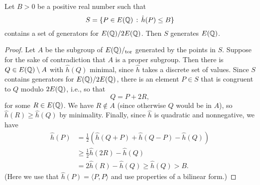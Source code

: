 \begin{lemma}\label{lem:allgen}
Let $B>0$ be a positive real number such that 
$$
   S = \{ P \in E(\mathbb{Q})\, : \, \hat{h}(P) \leq B \}
$$
contains a set of generators for $E(\mathbb{Q})/2 E(\mathbb{Q})$.  Then
$S$ generates $E(\mathbb{Q})$.
\end{lemma}
\begin{proof}
  Let $A$ be the subgroup of $E(\mathbb{Q})/_{\operatorname{tor}}$ generated by the points
  in $S$.  Suppose for the sake of contradiction that $A$ is a proper
  subgroup. Then there is $Q\in E(\mathbb{Q})\setminus A$ with $\hat{h}(Q)$
minimal, since $\hat{h}$ takes a discrete set of values.
Since $S$ contains generators for $E(\mathbb{Q})/2 E(\mathbb{Q})$, there is
an element $P \in S$ that is congruent to $Q$ modulo $2 E(\mathbb{Q})$, 
i.e., so that
   $$
      Q = P + 2R,
$$
for some $R\in E(\mathbb{Q})$.
We have $R\not\in A$ (since otherwise $Q$ would be in $A$), so
$\hat{h}(R)\geq \hat{h}(Q)$ by minimality.  
Finally, since $\hat{h}$ is quadratic and nonnegative, we have
\begin{align*}
 \hat{h}(P) &= \frac{1}{2}\left(\hat{h}(Q+P) + \hat{h}(Q-P) - \hat{h}(Q)\right)\\
   &\geq \frac{1}{2} \hat{h}(2R) - \hat{h}(Q)\\
  &=2\hat{h}(R) - \hat{h}(Q) \geq \hat{h}(Q) > B.
\end{align*}
(Here we use that $\hat{h}(P) =\langle P, P\rangle$
and use properties of a bilinear form.)
\end{proof}

